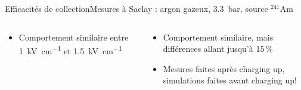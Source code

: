 \begin{frame}{Efficacités de collection}{Mesures à Saclay : argon gazeux, \SI{3.3}{\bar}, source $^{241}$Am}
\begin{scriptsize}
\begin{columns}
\begin{column}{0.5\textwidth}
            \end{column}
        \end{columns}
      		\begin{columns}
            \begin{column}{0.5\textwidth}
                \begin{itemize}
                    \item Comportement similaire entre \SI{1}{\kilo\volt\per\centi\meter} et \SI{1.5}{\kilo\volt\per\centi\meter}
                \end{itemize}
            \end{column}\hfill
            \begin{column}{0.5\textwidth}
                \begin{itemize}
                    \item Comportement similaire, mais différences allant jusqu'à 15\,\%
                    \item[\textcolor{red}{\danger}] Mesures faites après charging up, simulations faites avant charging up!
                \end{itemize}
            \end{column}
        \end{columns}
        \end{scriptsize}
    \end{frame}

